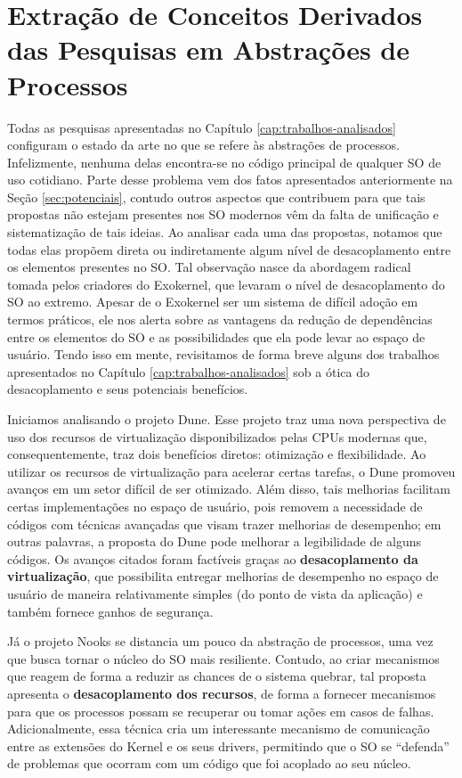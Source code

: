 

\section{Extração de Conceitos Derivados das Pesquisas em Abstrações de Processos}
\label{sec:extracao}

Todas as pesquisas apresentadas no Capítulo \ref{cap:trabalhos-analisados}
configuram o estado da arte no que se refere às abstrações de processos.
Infelizmente, nenhuma delas encontra-se no código principal de qualquer SO de
uso cotidiano. Parte desse problema vem dos fatos apresentados anteriormente na Seção
\ref{sec:potenciais}, contudo outros aspectos que contribuem para que tais
propostas não estejam presentes nos SO modernos vêm da falta de unificação e
sistematização de tais ideias. Ao analisar cada uma das propostas, notamos que
todas elas propõem direta ou indiretamente algum nível de desacoplamento entre
os elementos presentes no SO. Tal observação nasce da abordagem radical tomada
pelos criadores do Exokernel, que levaram o nível de desacoplamento do SO ao
extremo. Apesar de o Exokernel ser um sistema de difícil adoção em termos
práticos, ele nos alerta sobre as vantagens da redução de dependências
entre os elementos do SO e as possibilidades que ela pode levar ao espaço de
usuário. Tendo isso em mente, revisitamos de forma breve alguns dos trabalhos
apresentados no Capítulo \ref{cap:trabalhos-analisados} sob a ótica do
desacoplamento e seus potenciais benefícios.

Iniciamos analisando o projeto Dune. Esse projeto traz uma nova perspectiva de uso dos recursos de virtualização
disponibilizados pelas CPUs modernas que, consequentemente, traz dois
benefícios diretos: otimização e flexibilidade. Ao utilizar os recursos de
virtualização para acelerar certas tarefas, o Dune promoveu avanços em um setor
difícil de ser otimizado. Além disso, tais melhorias facilitam certas
implementações no espaço de usuário, pois removem a necessidade de códigos com
técnicas avançadas que visam trazer melhorias de desempenho; em outras
palavras, a proposta do Dune pode melhorar a legibilidade de alguns códigos.
Os avanços citados foram factíveis graças ao \textbf{desacoplamento da
virtualização}, que possibilita entregar melhorias de desempenho no
espaço de usuário de maneira relativamente simples (do ponto de vista da
aplicação) e também fornece ganhos de segurança.

Já o projeto Nooks se distancia um pouco da abstração de processos, uma vez que
busca tornar o núcleo do SO mais resiliente. Contudo, ao criar mecanismos
que reagem de forma a reduzir as chances de o sistema quebrar, tal proposta
apresenta o \textbf{desacoplamento dos recursos}, de forma a fornecer mecanismos
para que os processos possam se recuperar ou tomar ações em casos de falhas.
Adicionalmente, essa técnica cria um interessante mecanismo de
comunicação entre as extensões do Kernel e os seus drivers, permitindo que o SO
se ``defenda'' de problemas que ocorram com um código que foi acoplado ao seu
núcleo.


